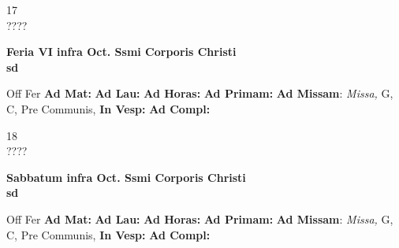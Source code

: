 \documentclass[10pt, openany]{book}
\begin{document}
    \begin{center}
        \begin{minipage}{3.5in}
            \vspace{2em}
            \begin{minipage}{0.5in}
                {\Huge 17} \\
                {\normalsize ????}
            \end{minipage}
            \begin{minipage}{3.0in}
                \textbf{ \large Feria VI infra Oct. Ssmi Corporis Christi \\
                \textnormal{\normalsize sd}}

            \end{minipage}
            \begin{justify}Off Fer
                \textbf{Ad Mat: }
                \textbf{Ad Lau: }
                \textbf{Ad Horas: }
                \textbf{Ad Primam: }\textbf{Ad Missam}: \textit{Missa,} G, C, Pre Communis, 
                \textbf{In Vesp: }
                \textbf{Ad Compl: }
            \end{justify}
        \end{minipage}
    \end{center}

    \begin{center}
        \begin{minipage}{3.5in}
            \vspace{2em}
            \begin{minipage}{0.5in}
                {\Huge 18} \\
                {\normalsize ????}
            \end{minipage}
            \begin{minipage}{3.0in}
                \textbf{ \large Sabbatum infra Oct. Ssmi Corporis Christi \\
                \textnormal{\normalsize sd}}

            \end{minipage}
            \begin{justify}Off Fer
                \textbf{Ad Mat: }
                \textbf{Ad Lau: }
                \textbf{Ad Horas: }
                \textbf{Ad Primam: }\textbf{Ad Missam}: \textit{Missa,} G, C, Pre Communis, 
                \textbf{In Vesp: }
                \textbf{Ad Compl: }
            \end{justify}
        \end{minipage}
    \end{center}
\end{document}
